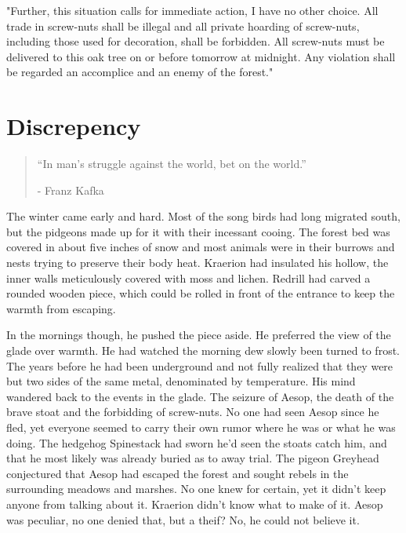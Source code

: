\documentclass[smalldemyvopaper,11pt,twoside,onecolumn,openright,extrafontsizes]{memoir}
\begin{document}
"Further, this situation calls for immediate action, I have no other choice. All trade in screw-nuts shall be illegal and all private hoarding of screw-nuts, including those used for decoration, shall be forbidden. All screw-nuts must be delivered to this oak tree on or before tomorrow at midnight. Any violation shall be regarded an accomplice and an enemy of the forest."


\chapter{Discrepency}

\vspace{-1.3cm}
\begin{localsize}{10}
	\begin{quote}
		“In man's struggle against the world, bet on the world.”
		\begin{flushright}- Franz Kafka \end{flushright}
	\end{quote} 
\end{localsize}
\vspace{1cm}

The winter came early and hard. Most of the song birds had long migrated south, but the pidgeons made up for it with their incessant cooing. The forest bed was covered in about five inches of snow and most animals were in their burrows and nests trying to preserve their body heat. Kraerion had insulated his hollow, the inner walls meticulously covered with moss and lichen. Redrill had carved a rounded wooden piece, which could be rolled in front of the entrance to keep the warmth from escaping.

In the mornings though, he pushed the piece aside. He preferred the view of the glade over warmth. He had watched the morning dew slowly been turned to frost. The years before he had been underground and not fully realized that they were but two sides of the same metal, denominated by temperature. His mind wandered back to the events in the glade. The seizure of Aesop, the death of the brave stoat and the forbidding of screw-nuts. No one had seen Aesop since he fled, yet everyone seemed to carry their own rumor where he was or what he was doing. The hedgehog Spinestack had sworn he'd seen the stoats catch him, and that he most likely was already buried as to away trial. The pigeon Greyhead conjectured that Aesop had escaped the forest and sought rebels in the surrounding meadows and marshes. No one knew for certain, yet it didn't keep anyone from talking about it. Kraerion didn't know what to make of it. Aesop was peculiar, no one denied that, but a theif? No, he could not believe it.
\end{document}
